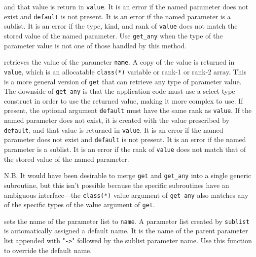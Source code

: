 \documentclass[11pt]{article}
\begin{document}
\begin{description}[style=nextline]
  and that value is return in \texttt{value}.  It is an error if the named
  parameter does not exist and \texttt{default} is not present.  It is an
  error if the named parameter is a sublist. It is an error if the type, kind,
  and rank of \texttt{value} does not match the stored value of the named
  parameter.  Use \texttt{get_any} when the type of the parameter value is not
  one of those handled by this method.
\item[\texttt{get_any(name, value \Lbr,default\Rbr\ \Lbr,stat \Lbr,errmsg\Rbr\Rbr)}]
  retrieves the value of the parameter \texttt{name}.  A copy of the value is
  returned in \texttt{value}, which is an allocatable \texttt{class(*)} variable
  or rank-1 or rank-2 array.  This is a more general version of \texttt{get} that can
  retrieve any type of parameter value.  The downside of \texttt{get_any} is
  that the application code must use a select-type construct in order to use
  the returned value, making it more complex to use.  If present, the optional
  argument \texttt{default} must have the same rank as \texttt{value}.  If the
  named parameter does not exist, it is created with the value prescribed by
  \texttt{default}, and that value is returned in \texttt{value}.  It is an
  error if the named parameter does not exist and \texttt{default} is not
  present.  It is an error if the named parameter is a sublist.  It is an
  error if the rank of \texttt{value} does not match that of the stored value
  of the named parameter. \par
  N.B. It would have been desirable to merge \texttt{get} and \texttt{get_any}
  into a single generic subroutine, but this isn't possible because the
  specific subroutines have an ambiguous interface---the \texttt{class(*)}
  value argument of \texttt{get_any} also matches any of the specific types
  of the value argument of \texttt{get}.
\item[\texttt{set_name(name)}]
  sets the name of the parameter list to \texttt{name}.  A parameter list
  created by \texttt{sublist} is automatically assigned a default name. It is
  the name of the parent parameter list appended with "\texttt{->}" followed
  by the sublist parameter name.  Use this function to override the default
  name.
\end{description}
\end{document}
